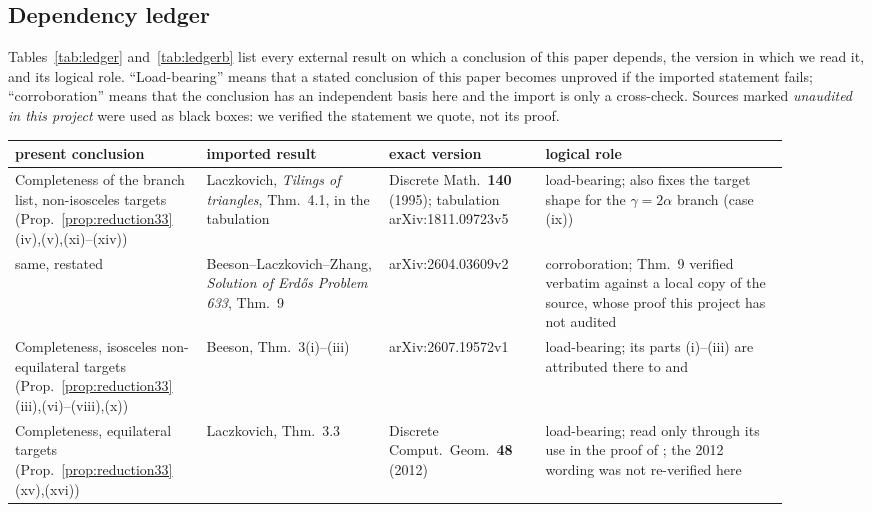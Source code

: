 \documentclass[11pt]{amsart}
\theoremstyle{definition}
\theoremstyle{remark}
\begin{document}
\subsection{Dependency ledger}\label{app:ledger-deps}

Tables~\ref{tab:ledger} and~\ref{tab:ledgerb} list every external result on which a conclusion of
this paper depends, the version in which we read it, and its logical role.
``Load-bearing'' means that a stated conclusion of this paper becomes
unproved if the imported statement fails; ``corroboration'' means that the
conclusion has an independent basis here and the import is only a
cross-check.  Sources marked \emph{unaudited in this project} were used as
black boxes: we verified the statement we quote, not its proof.

\begin{table}[ht]
\centering
\small
\renewcommand{\arraystretch}{1.16}
\begin{tabular}{@{}>{\raggedright\arraybackslash}p{0.215\linewidth}
>{\raggedright\arraybackslash}p{0.215\linewidth}
>{\raggedright\arraybackslash}p{0.185\linewidth}
>{\raggedright\arraybackslash}p{0.28\linewidth}@{}}
\toprule
present conclusion & imported result & exact version & logical role \\
\midrule
Completeness of the branch list, non-isosceles targets
 (Prop.~\ref{prop:reduction33}(iv),(v),(xi)--(xiv))
 & Laczkovich, \emph{Tilings of triangles}, Thm.~4.1, in the tabulation
   \cite[Table~4]{Beeson7}
 & Discrete Math.\ \textbf{140} (1995); tabulation arXiv:1811.09723v5
 & load-bearing; also fixes the target shape for the $\gamma=2\alpha$
   branch (case (ix)) \\
same, restated
 & Beeson--Laczkovich--Zhang, \emph{Solution of Erd\H os Problem 633},
   Thm.~9
 & arXiv:2604.03609v2
 & corroboration; Thm.~9 verified verbatim against a local copy of the
   source, whose proof this project has not audited \\
Completeness, isosceles non-equilateral targets
 (Prop.~\ref{prop:reduction33}(iii),(vi)--(viii),(x))
 & Beeson, Thm.~3(i)--(iii)
 & arXiv:2607.19572v1
 & load-bearing; its parts (i)--(iii) are attributed there to
   \cite[Thm.~3.1]{BeesonIso} and \cite{Lacz95} \\
Completeness, equilateral targets
 (Prop.~\ref{prop:reduction33}(xv),(xvi))
 & Laczkovich, Thm.~3.3
 & Discrete Comput.\ Geom.\ \textbf{48} (2012)
 & load-bearing; read only through its use in the proof of
   \cite[Thm.~11]{BeesonPrime}; the 2012 wording was not re-verified here \\

\end{tabular}
\end{table}
\end{document}
